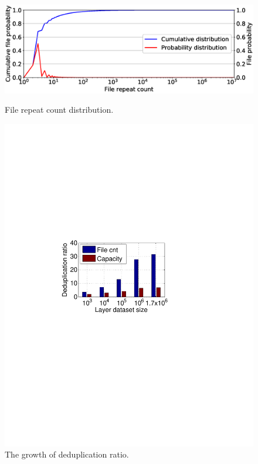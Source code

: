 
\begin{figure}[t]
	\centering
	\begin{minipage}{0.235\textwidth}
		\centering
		\includegraphics[width=1\textwidth]{graphs/File_repeat_count.eps}
		\caption{File repeat count distribution.
		}
		\label{fig:ref_count}
	\end{minipage}
	\begin{minipage}{0.225\textwidth}
		\centering
		\includegraphics[width=1\textwidth]{graphs/dedup-ratio-grow} 
		\caption{The growth of deduplication ratio.
		} 
		\label{fig:layer-size-cdf}
	\end{minipage}
\end{figure}


